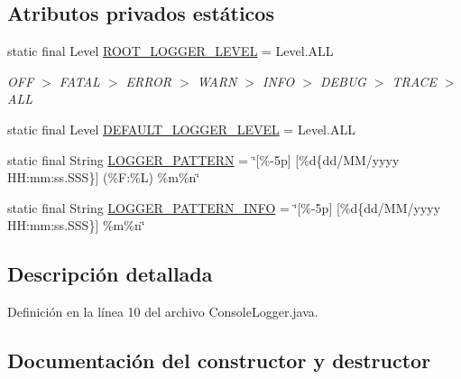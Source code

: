 \subsection*{Atributos privados estáticos}
\begin{DoxyCompactItemize}
\item 
static final Level \mbox{\hyperlink{a00220_ae460ea729626c8bac117b5d2e27913fa}{R\+O\+O\+T\+\_\+\+L\+O\+G\+G\+E\+R\+\_\+\+L\+E\+V\+EL}} = Level.\+A\+LL
\begin{DoxyCompactList}\small\item\em {\ttfamily O\+FF $>$ F\+A\+T\+AL $>$ E\+R\+R\+OR $>$ W\+A\+RN $>$ I\+N\+FO $>$ D\+E\+B\+UG $>$ T\+R\+A\+CE $>$ A\+LL} \end{DoxyCompactList}\item 
static final Level \mbox{\hyperlink{a00220_ae0220e0b1c6452568125f7f1285627be}{D\+E\+F\+A\+U\+L\+T\+\_\+\+L\+O\+G\+G\+E\+R\+\_\+\+L\+E\+V\+EL}} = Level.\+A\+LL
\item 
static final String \mbox{\hyperlink{a00220_a7ea77718b8e1412c1d637c7a5ae4e7c0}{L\+O\+G\+G\+E\+R\+\_\+\+P\+A\+T\+T\+E\+RN}} = \char`\"{}\mbox{[}\%-\/5p\mbox{]} \mbox{[}\%d\{dd/\+M\+M/yyyy H\+H\+:mm\+:ss.\+S\+S\+S\}\mbox{]} (\%\+F\+:\%\+L) \%m\%n\char`\"{}
\item 
static final String \mbox{\hyperlink{a00220_a098472007554045743104c7534609e02}{L\+O\+G\+G\+E\+R\+\_\+\+P\+A\+T\+T\+E\+R\+N\+\_\+\+I\+N\+FO}} = \char`\"{}\mbox{[}\%-\/5p\mbox{]} \mbox{[}\%d\{dd/\+M\+M/yyyy H\+H\+:mm\+:ss.\+S\+S\+S\}\mbox{]} \%m\%n\char`\"{}
\end{DoxyCompactItemize}


\subsection{Descripción detallada}


Definición en la línea 10 del archivo Console\+Logger.\+java.



\subsection{Documentación del constructor y destructor}
\mbox{\label{a00220_a51a46eb118739bc4e500b3f257ca170e}} 
